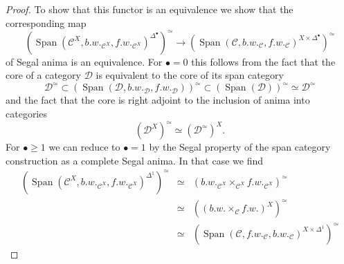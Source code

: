 \documentclass{article}
\newcommand{\cC}{\mathcal{C}}
\newcommand{\cD}{\mathcal{D}}
\DeclareMathOperator{\Span}{Span}
\begin{document}
\begin{proof}
    To show that this functor is an equivalence we show that the corresponding map 
    \[
        \left( \Span(\cC^X, b.w._{\cC^X}, f.w._{\cC^X})^{\Delta^\bullet}\right)^\simeq \to \left(\Span(\cC,b.w._{\cC}, f.w._{\cC})^{X \times \Delta^\bullet}\right)^\simeq
    \]
    of Segal anima is an equivalence.
    For $\bullet = 0$ this follows from the fact that the core of a category $\cD$ is equivalent to the core of its span category 
    \[
        \cD^\simeq \subset \left(\Span(\cD, b.w._{\cD}, f.w._{\cD})\right)^\simeq \subset \left(\Span(\cD)\right)^\simeq \simeq \cD^\simeq 
    \]
    and the fact that the core is right adjoint to the inclusion of anima into categories
    \[
      \left(\cD^X\right)^\simeq \simeq (\cD^\simeq)^X.
    \]
    For $\bullet \geq 1$ we can reduce to $\bullet = 1$ by the Segal property of the span category construction as a complete Segal anima.
    In that case we find
    \begin{eqnarray*}
        \left(\Span(\cC^X, b.w._{\cC^X}, f.w._{\cC^X} )^{\Delta^1}\right)^\simeq & \simeq & \left(b.w._{\cC^X} \times_{\cC^X}f.w._{\cC^X}\right)^\simeq \\
        & \simeq & \left((b.w. \times_{\cC} f.w.)^X\right)^\simeq \\
        & \simeq & \left(\Span(\cC,f.w._{\cC}, b.w._{\cC})^{X \times \Delta^1}\right)^\simeq
    \end{eqnarray*}

\end{proof}
\end{document}
